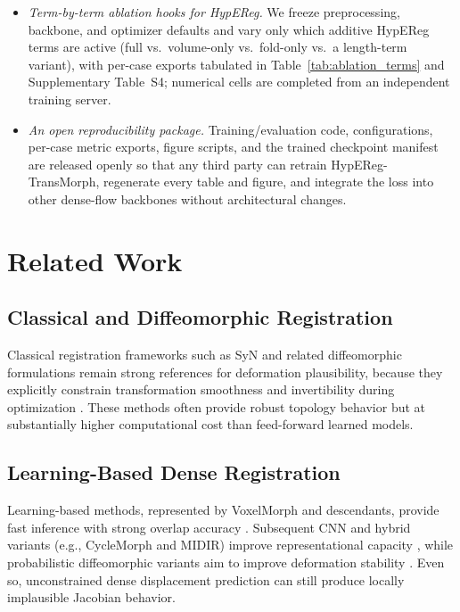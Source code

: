 \documentclass[jimaging,article,submit,pdftex,moreauthors]{Definitions/mdpi}
\begin{document}
\begin{itemize}
\item \emph{Term-by-term ablation hooks for HypEReg.} We freeze preprocessing, backbone, and optimizer defaults and vary only which additive HypEReg terms are active (full vs.\ volume-only vs.\ fold-only vs.\ a length-term variant), with per-case exports tabulated in Table~\ref{tab:ablation_terms} and Supplementary Table~S4; numerical cells are completed from an independent training server.
\item \emph{An open reproducibility package.} Training/evaluation code, configurations, per-case metric exports, figure scripts, and the trained checkpoint manifest are released openly so that any third party can retrain HypEReg-TransMorph, regenerate every table and figure, and integrate the loss into other dense-flow backbones without architectural changes.
\end{itemize}

\section{Related Work}

\subsection{Classical and Diffeomorphic Registration}
Classical registration frameworks such as SyN and related diffeomorphic formulations remain strong references for deformation plausibility, because they explicitly constrain transformation smoothness and invertibility during optimization \cite{avants2008ants,rueckert1999nonrigid,ashburner1999morphometry}. These methods often provide robust topology behavior but at substantially higher computational cost than feed-forward learned models.

\subsection{Learning-Based Dense Registration}
Learning-based methods, represented by VoxelMorph and descendants, provide fast inference with strong overlap accuracy \cite{balakrishnan2019voxelmorph}. Subsequent CNN and hybrid variants (e.g., CycleMorph and MIDIR) improve representational capacity \cite{kim2021cyclemorph}, while probabilistic diffeomorphic variants aim to improve deformation stability \cite{dalca2019probreg}. Even so, unconstrained dense displacement prediction can still produce locally implausible Jacobian behavior.
\end{document}
